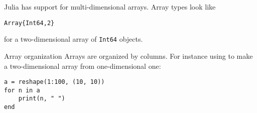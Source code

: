 Julia has support for multi-dimensional arrays.
Array types look like
\begin{lstlisting}
Array{Int64,2}  
\end{lstlisting}
for a two-dimensional array of \lstinline{Int64} objects.

\begin{block}{Array organization}
  Arrays are organized by columns. For instance using
   to make a two-dimensional array
  from  one-dimensional one:
\begin{lstlisting}
a = reshape(1:100, (10, 10))
for n in a
    print(n, " ")
end
\end{lstlisting}
\end{block}

\begin{comment}
  \Level 1 {Matrix as vector of vectors}

  \begin{block}{Multi-dimensional vectors}
    \label{sl:multi-vector}
    Multi-dimensional is harder with vectors:
    \begin{lstlisting}
      vector<float> row(20);
      vector<vector<float>> rows(10,row);
      // alternative:
      vector<vector<float>> rows(10);
      for ( auto &row : rows )
      row = vector<float>(20);
    \end{lstlisting}
    Create a row vector, then store 10 copies of that:\\
    vector of vectors.
  \end{block}

  This is not the best implementation of a matrix, for instance because
  the elements are not contiguous. However, let's continue with it for a moment.

  \begin{block}{Matrix class}
    \label{sl:matrix-class}
    \verbatimsnippet{matrixclassdef}
  \end{block}

  \begin{exercise}
    \label{ex:matrixclass-rowcol1}
    Write \n{rows()} and \n{cols()} methods for this class that return
    the number of rows ad columns respectively.
  \end{exercise}

  \begin{exercise}
    \label{ex:matrix-methods}
    Add methods such as \n{transpose}, \n{scale} to your matrix class.

    Implement matrix-matrix multiplication.
  \end{exercise}


\end{comment}
